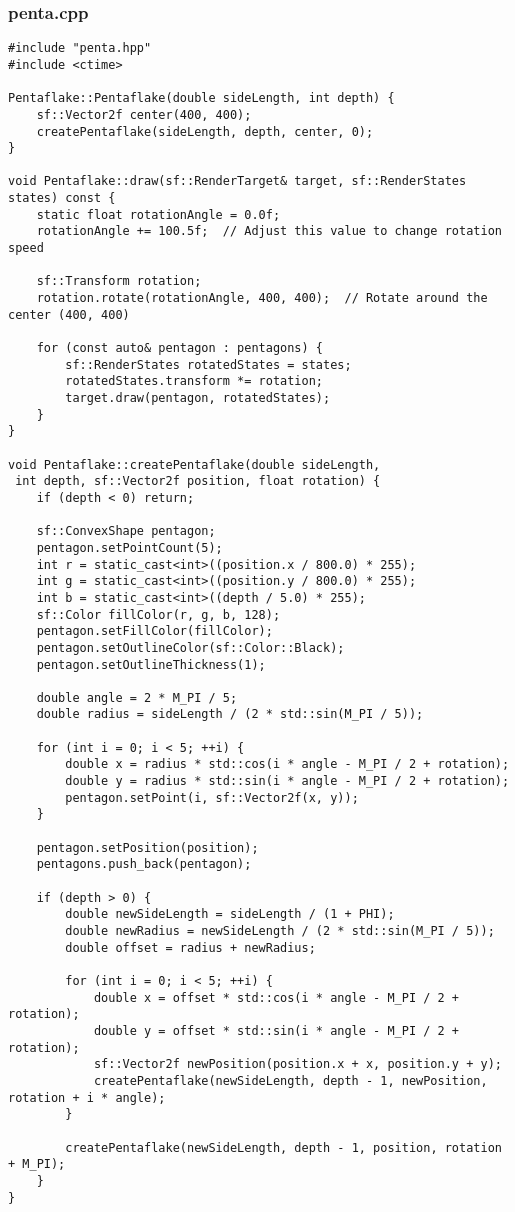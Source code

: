\documentclass[12pt]{article}
\begin{document}
\subsubsection{penta.cpp}
\begin{lstlisting}[style=cppcode]
#include "penta.hpp"
#include <ctime>

Pentaflake::Pentaflake(double sideLength, int depth) {
    sf::Vector2f center(400, 400);
    createPentaflake(sideLength, depth, center, 0);
}

void Pentaflake::draw(sf::RenderTarget& target, sf::RenderStates states) const {
    static float rotationAngle = 0.0f;
    rotationAngle += 100.5f;  // Adjust this value to change rotation speed

    sf::Transform rotation;
    rotation.rotate(rotationAngle, 400, 400);  // Rotate around the center (400, 400)

    for (const auto& pentagon : pentagons) {
        sf::RenderStates rotatedStates = states;
        rotatedStates.transform *= rotation;
        target.draw(pentagon, rotatedStates);
    }
}

void Pentaflake::createPentaflake(double sideLength,
 int depth, sf::Vector2f position, float rotation) {
    if (depth < 0) return;

    sf::ConvexShape pentagon;
    pentagon.setPointCount(5);
    int r = static_cast<int>((position.x / 800.0) * 255);
    int g = static_cast<int>((position.y / 800.0) * 255);
    int b = static_cast<int>((depth / 5.0) * 255);
    sf::Color fillColor(r, g, b, 128);
    pentagon.setFillColor(fillColor);
    pentagon.setOutlineColor(sf::Color::Black);
    pentagon.setOutlineThickness(1);

    double angle = 2 * M_PI / 5;
    double radius = sideLength / (2 * std::sin(M_PI / 5));

    for (int i = 0; i < 5; ++i) {
        double x = radius * std::cos(i * angle - M_PI / 2 + rotation);
        double y = radius * std::sin(i * angle - M_PI / 2 + rotation);
        pentagon.setPoint(i, sf::Vector2f(x, y));
    }

    pentagon.setPosition(position);
    pentagons.push_back(pentagon);

    if (depth > 0) {
        double newSideLength = sideLength / (1 + PHI);
        double newRadius = newSideLength / (2 * std::sin(M_PI / 5));
        double offset = radius + newRadius;

        for (int i = 0; i < 5; ++i) {
            double x = offset * std::cos(i * angle - M_PI / 2 + rotation);
            double y = offset * std::sin(i * angle - M_PI / 2 + rotation);
            sf::Vector2f newPosition(position.x + x, position.y + y);
            createPentaflake(newSideLength, depth - 1, newPosition, rotation + i * angle);
        }

        createPentaflake(newSideLength, depth - 1, position, rotation + M_PI);
    }
}
\end{lstlisting}
\end{document}
